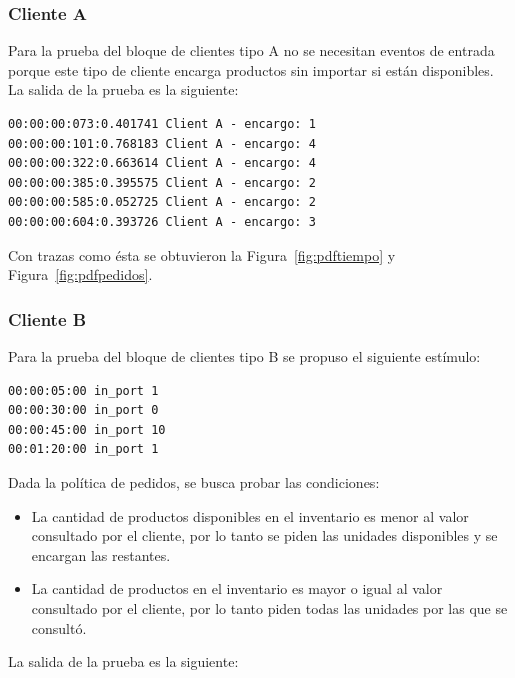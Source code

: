\documentclass[10pt]{article}
\begin{document}
\subsubsection{Cliente A}
Para la prueba del bloque de clientes tipo A no se necesitan eventos de entrada porque este tipo de cliente encarga productos sin importar si están disponibles. La salida de la prueba es la siguiente:

\begin{minipage}{1\textwidth}
	\centering
	\begin{lstlisting}
00:00:00:073:0.401741 Client A - encargo: 1
00:00:00:101:0.768183 Client A - encargo: 4
00:00:00:322:0.663614 Client A - encargo: 4
00:00:00:385:0.395575 Client A - encargo: 2
00:00:00:585:0.052725 Client A - encargo: 2
00:00:00:604:0.393726 Client A - encargo: 3
	\end{lstlisting}
	
\end{minipage}
Con trazas como ésta se obtuvieron la Figura~\ref{fig:pdftiempo} y Figura~\ref{fig:pdfpedidos}. 

\subsubsection{Cliente B}
Para la prueba del bloque de clientes tipo B se propuso el siguiente estímulo:

\begin{minipage}{1\textwidth}
	\centering
	\begin{lstlisting}
00:00:05:00 in_port 1
00:00:30:00 in_port 0
00:00:45:00 in_port 10
00:01:20:00 in_port 1
	\end{lstlisting}
\end{minipage}

Dada la política de pedidos, se busca probar las condiciones:
\begin{itemize}
\item La cantidad de productos disponibles en el inventario es menor al valor consultado por el cliente, por lo tanto se piden las unidades disponibles y se encargan las restantes.
\item La cantidad de productos en el inventario es mayor o igual al valor consultado por el cliente, por lo tanto piden todas las unidades por las que se consultó.
\end{itemize}

La salida de la prueba es la siguiente:
\end{document}
